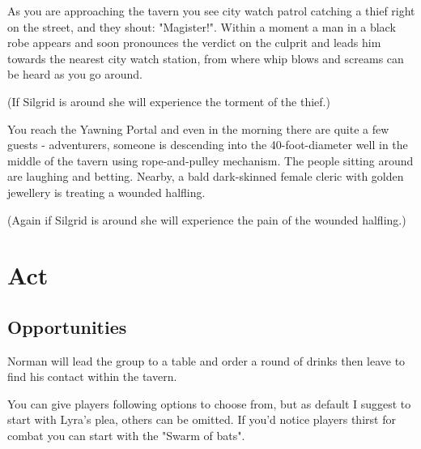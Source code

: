 \documentclass[10pt,onecolumn,twoside,openany,bg=full,layout=true]{dndbook}
\begin{document}
\begin{DndReadAloud}
As you are approaching the tavern you see city watch patrol catching a thief right on the street, and they shout: "Magister!".
Within a moment a man in a black robe appears and soon pronounces the verdict on the culprit and leads him towards the
nearest city watch station, from where whip blows and screams can be heard as you go around.
\end{DndReadAloud}
(If Silgrid is around she will experience the torment of the thief.)

\begin{DndReadAloud}
You reach the Yawning Portal and even in the morning there are quite a few guests - adventurers,
someone is descending into the 40-foot-diameter well in the middle of the tavern using rope-and-pulley mechanism.
The people sitting around are laughing and betting.
Nearby, a bald dark-skinned female cleric with golden jewellery is treating a wounded halfling.
\end{DndReadAloud}
(Again if Silgrid is around she will experience the pain of the wounded halfling.)
\vfill
\newpage

\section{Act }\label{sec:act-\roman{act_num}}
\addtocounter{act_num}{1}

\subsection{Opportunities}\label{subsec:opportunities}
Norman will lead the group to a table and order a round of drinks then leave to find his contact within the tavern.

You can give players following options to choose from, but as default I suggest to start with Lyra's plea, others can be omitted.
If you'd notice players thirst for combat you can start with the "Swarm of bats".
\end{document}
